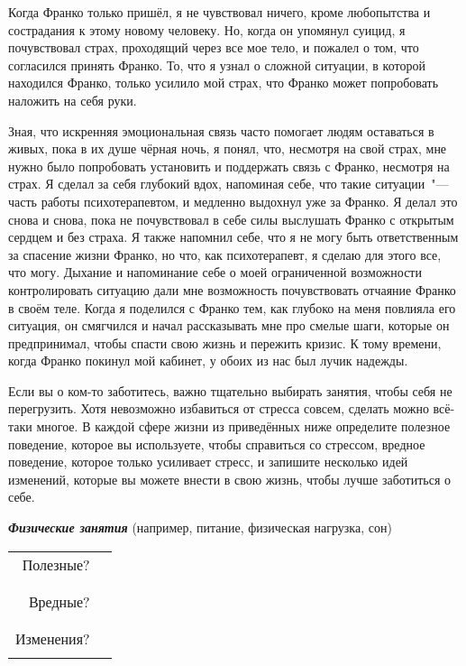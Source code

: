 Когда Франко только пришёл, я не чувствовал ничего, кроме любопытства и сострадания к этому новому человеку. Но, когда он упомянул суицид, я почувствовал страх, проходящий через все мое тело, и пожалел о том, что согласился принять Франко. То, что я узнал о сложной ситуации, в которой находился Франко, только усилило мой страх, что Франко может попробовать наложить на себя руки.

Зная, что искренняя эмоциональная связь часто помогает людям оставаться в живых, пока в их душе чёрная ночь, я понял, что, несмотря на свой страх, мне нужно было попробовать установить и поддержать связь с Франко, несмотря на страх. Я сделал за себя глубокий вдох, напоминая себе, что такие ситуации~"--- часть работы психотерапевтом, и медленно выдохнул уже за Франко. Я делал это снова и снова, пока не почувствовал в себе силы выслушать Франко с открытым сердцем и без страха. Я также напомнил себе, что я не могу быть ответственным за спасение жизни Франко, но что, как психотерапевт, я сделаю для этого все, что могу. Дыхание и напоминание себе о моей ограниченной возможности контролировать ситуацию дали мне возможность почувствовать отчаяние Франко в своём теле. Когда я поделился с Франко тем, как глубоко на меня повлияла его ситуация, он смягчился и начал рассказывать мне про смелые шаги, которые он предпринимал, чтобы спасти свою жизнь и пережить кризис. К тому времени, когда Франко покинул мой кабинет, у обоих из нас был лучик надежды.

\newpage
{} \label{Ex:Reducing_Stress_for_Caregivers}

Если вы о ком-то заботитесь, важно тщательно выбирать занятия, чтобы себя не перегрузить. Хотя невозможно избавиться от стресса совсем, сделать можно всё-таки многое. В каждой сфере жизни из приведённых ниже определите полезное поведение, которое вы используете, чтобы справиться со стрессом, вредное поведение, которое только усиливает стресс, и запишите несколько идей изменений, которые вы можете внести в свою жизнь, чтобы лучше заботиться о себе.

\vspace{5ex}

\noindent\textbf{\emph{Физические занятия}} (например, питание, физическая нагрузка, сон)

\vspace{2ex}

\noindent
\setlength{\extrarowheight}{2mm}
\begin{tabular*}{\textwidth}{rp{11.7cm}}
	Полезные? & \\ \cline{2-2}
	  & \\ \cline{2-2}
	  \\
	Вредные? & \\ \cline{2-2}
	  & \\ \cline{2-2}
	  \\
	Изменения? & \\ \cline{2-2}
	  & \\ \cline{2-2}
\end{tabular*}
\setlength{\extrarowheight}{0mm}

